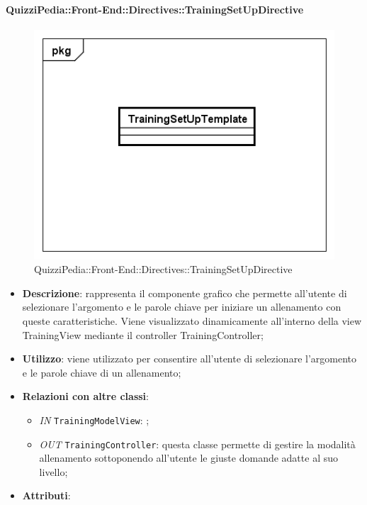 		\paragraph{QuizziPedia::Front-End::Directives::TrainingSetUpDirective}
		
		\label{QuizziPedia::Front-End::Directives::TrainingSetUpDirective}
		
		\begin{figure}[ht]
			\centering
			\includegraphics[scale=0.5,keepaspectratio]{UML/Classi/Front-End/QuizziPedia_Front-end_Templates_TrainingSetUpTemplate.png}
			\caption{QuizziPedia::Front-End::Directives::TrainingSetUpDirective}
		\end{figure} \FloatBarrier
		
		\begin{itemize}
			\item \textbf{Descrizione}: rappresenta il componente grafico che permette all'utente di selezionare l'argomento e le parole chiave per iniziare un allenamento con queste caratteristiche. Viene visualizzato dinamicamente all'interno della view TrainingView mediante il controller TrainingController;
			\item \textbf{Utilizzo}: viene utilizzato per consentire all'utente di selezionare l'argomento e le parole chiave di un allenamento;
			\item \textbf{Relazioni con altre classi}: 
			\begin{itemize}
				\item \textit{IN} \texttt{TrainingModelView}: ; 
				\item \textit{OUT} \texttt{TrainingController}: questa classe permette di gestire la modalità allenamento sottoponendo all'utente le giuste domande adatte al suo livello;
			\end{itemize}
			\item \textbf{Attributi}: 
			\begin{itemize}

			\end{itemize}
		\end{itemize}
		

